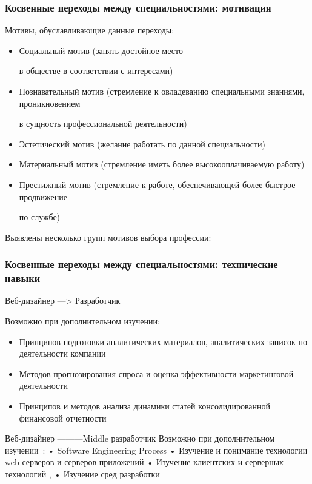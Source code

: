 \documentclass{../industrial-development}
\begin{document}
\begin{frame} \frametitle{Косвенные переходы между специальностями: мотивация }

 \begin{block}{}
Мотивы, обуславливающие данные переходы:
  \end{block}
\begin{itemize}
\item Социальный мотив (занять достойное место 

в обществе в соответствии с интересами)
\item Познавательный мотив (стремление к овладеванию специальными знаниями, проникновением 

в сущность профессиональной деятельности)
\item Эстетический мотив (желание работать по данной специальности)
\item Материальный мотив (стремление иметь более высокооплачиваемую работу) 
\item Престижный мотив (стремление к работе, обеспечивающей более быстрое продвижение 

по службе)
  \end{itemize}
\end{frame}

\lecturenotes

Выявлены несколько групп мотивов выбора профессии:



\begin{frame} \frametitle{Косвенные переходы между специальностями: технические навыки }

\begin{block}{Веб-дизайнер ---> Разработчик }

Возможно при дополнительном изучении:
  \end{block}
\begin{itemize}
  \item Принципов подготовки аналитических материалов, аналитических записок по деятельности компании
  \item Методов прогнозирования спроса и оценка эффективности маркетинговой деятельности
\item Принципов и методов анализа динамики статей консолидированной финансовой отчетности
  \end{itemize}
\end{frame}

\lecturenotes

Веб-дизайнер ---------Middle разработчик
Возможно при дополнительном изучении~\cite{rab}:
•	Software Engineering Process
•	 Изучение и понимание технологии web-серверов и серверов приложений
•	Изучение клиентских и серверных технологий , 
•	Изучение сред разработки
\end{document}
